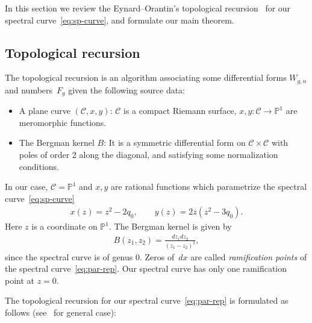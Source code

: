 \documentclass[pdftex]{sigma}
\theoremstyle{definition}
\numberwithin{equation}{section}
\begin{document}
In this section we review the Eynard--Orantin's
topological recursion~\cite{EO07} for our
spectral cur\-ve~\eqref{eq:sp-curve},
and formulate our main theorem.

\subsection{Topological recursion}
\label{section:top-recursion}

The topological recursion is an algorithm associating some
dif\/ferential forms $W_{g,n}$ and num\-bers~$F_{g}$
given the following source data:
\begin{itemize}\itemsep=0pt
\item
A plane curve $({\mathcal C}, x, y)$: ${\mathcal C}$ is a
compact Riemann surface, $x, y\colon {\mathcal C} \rightarrow {\mathbb P}^{1}$
are meromorphic functions.
\item
The Bergman kernel $B$:
It is a symmetric dif\/ferential form on ${\mathcal C} \times {\mathcal C}$
with poles of order 2 along the diagonal, and
satisfying some normalization conditions.
\end{itemize}


In our case, ${\mathcal C} = {\mathbb P}^1$ and $x, y$ are
rational functions which parametrize the spectral curve~\eqref{eq:sp-curve}
\begin{gather} \label{eq:par-rep}
x(z) = z^{2} - 2 q_{0}, \qquad
y(z) = 2z(z^{2} - 3q_{0}).
\end{gather}
Here $z$ is a coordinate on ${\mathbb P}^1$.
The Bergman kernel is given by
\begin{gather*}
B(z_1, z_2) = \frac{dz_{1}dz_{2}}{(z_{1}-z_{2})^{2}},
\end{gather*}
since the spectral curve is of genus $0$.
Zeros of~$dx$ are called {\em ramification points} of the
spectral curve~\eqref{eq:par-rep}.
Our spectral curve has only one ramif\/ication point at $z=0$.

The topological recursion for our spectral curve~\eqref{eq:par-rep}
is formulated as follows (see~\cite{EO07} for general case):
\end{document}
